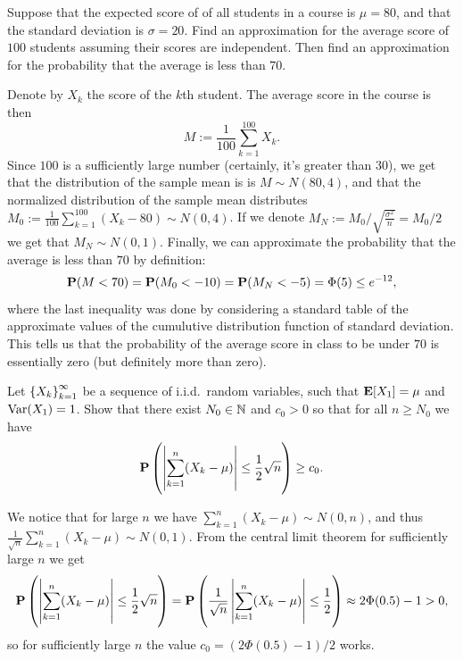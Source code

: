 \documentclass[11pt,a4paper]{article}
\begin{document}
\begin{exercise}
  Suppose that the expected score of of all students in a course is
  $\mu = 80$,
  and that the standard deviation is $\sigma = 20$.
  Find an approximation for the average score of $100$ students
  assuming their scores are independent.
  Then find an approximation for the probability that the average
  is less than $70$.
\end{exercise}
\begin{solution}
  Denote by $X_k$ the score of the $k$th student.
  The average score in the course is then
  \[
    M :=
    \frac{1}{100} \sum_{k=1}^{100} X_k.
  \]
  Since $100$ is a sufficiently large number (certainly, it's greater
  than $30$), we get that the distribution of the sample mean is
  is $M \sim N(80,4)$,
  and that the normalized distribution of the sample mean distributes
  $M_0 := \frac{1}{100} \sum_{k=1}^{100} (X_k - 80) \sim N(0,4)$.
  If we denote $M_N := M_0 / \sqrt{\frac{\sigma^2}{n}} = M_0 / 2$
  we get that $M_N \sim N(0,1)$.
  Finally, we can approximate the probability that the average
  is less than $70$ by definition:
  \[
    \mathbf{P}(M < 70) =
    \mathbf{P}(M_0 < -10) =
    \mathbf{P}(M_N < -5) = \Phi(5) \le  e^{-12},
  \]
  where the last inequality was done by considering a standard table
  of the approximate values of the cumulutive distribution function
  of standard deviation.
  This tells us that the probability of the average score in class
  to be under $70$ is essentially zero (but definitely more than zero).
\end{solution}

\begin{exercise}
  Let $\left\{X_k\right\}_{k=1}^{\infty}$ be a sequence of i.i.d.\ random variables,
  such that $\mathbf{E}[X_1] = \mu$ and $\operatorname{Var}(X_1) = 1$.
  Show that there exist $N_0 \in \mathbb{N}$ and $c_0 > 0$ so that for all
  $n \geq N_0$ we have
  \[
    \Prob\del{\abs{\sum_{k=1}^{n} (X_k - \mu)} \le \half \sqrt{n}} \geq c_0.
  \]
\end{exercise}
\begin{solution}
  We notice that for large $n$ we have
  $\sum_{k=1}^{n} (X_k - \mu) \sim N(0,n)$,
  and thus $\frac{1}{\sqrt{n}} \sum_{k=1}^{n} (X_k - \mu) \sim N(0,1)$.
  From the central limit theorem for sufficiently large $n$ we get
  \[
    \Prob\del{\abs{\sum_{k=1}^{n} (X_k - \mu)} \le \half \sqrt{n}} =
    \Prob\del{\frac{1}{\sqrt{n}}
      \abs{\sum_{k=1}^{n} (X_k - \mu)} \le \half} \approx
    2\Phi(0.5) - 1 > 0,
  \]
  so for sufficiently large $n$ the value $c_0 = (2\Phi(0.5) - 1)/2$ works.
\end{solution}
\end{document}
